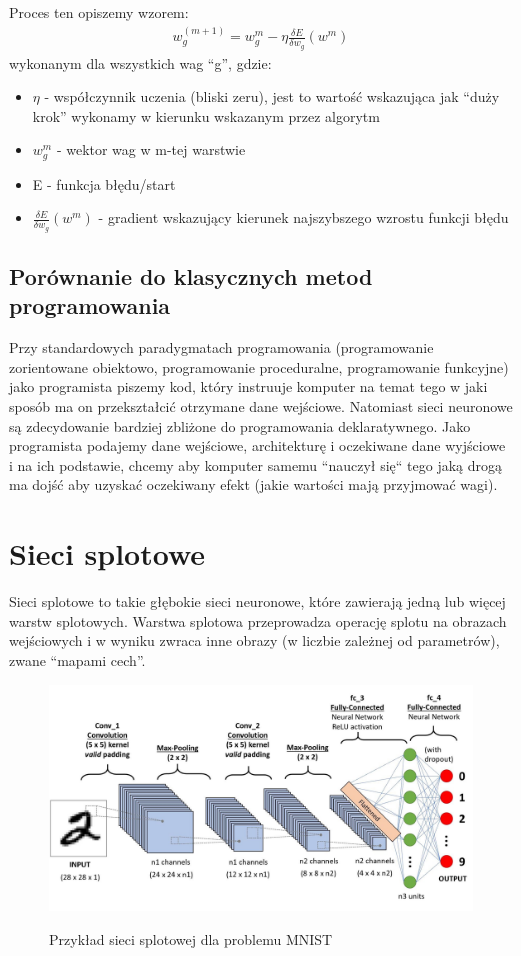 \documentclass{article}
\begin{document}
Proces ten opiszemy wzorem:
\begin{align*}
    w_g^{(m+1)}=w_g^m - \eta\frac{\delta E}{\delta w_g}(w^m)
\end{align*}
wykonanym dla wszystkich wag ``g'', gdzie:
\begin{itemize}
    \item $\eta$ - współczynnik uczenia (bliski zeru), jest to wartość wskazująca jak ``duży krok'' wykonamy w kierunku wskazanym przez algorytm
    \item $w_g^m$ - wektor wag w m-tej warstwie
    \item E - funkcja błędu/start
    \item $\frac{\delta E}{\delta w_g}(w^m)$ - gradient wskazujący kierunek najszybszego wzrostu funkcji błędu
\end{itemize}

\subsection{Porównanie do klasycznych metod programowania}
Przy standardowych paradygmatach programowania (programowanie zorientowane obiektowo, programowanie proceduralne, programowanie funkcyjne) jako programista piszemy kod, który
instruuje komputer na temat tego w jaki sposób ma on przekształcić otrzymane dane wejściowe.
Natomiast sieci neuronowe są zdecydowanie bardziej zbliżone do programowania deklaratywnego. Jako programista podajemy dane wejściowe, architekturę i oczekiwane dane wyjściowe i na ich podstawie, chcemy aby komputer samemu ``nauczył się`` tego jaką drogą ma dojść aby uzyskać oczekiwany efekt (jakie wartości mają przyjmować wagi).
\newpage
\section{Sieci splotowe}
Sieci splotowe to takie głębokie sieci neuronowe, które zawierają jedną lub więcej warstw splotowych.
Warstwa splotowa przeprowadza operację splotu na obrazach wejściowych i w wyniku zwraca inne obrazy (w liczbie zależnej od parametrów), zwane ``mapami cech''.
\begin{figure}[H]
    \centering
    \includegraphics[width=\linewidth]{images/cnn.jpeg}
    \caption{Przykład sieci splotowej dla problemu MNIST}
    \cite{cnn}
\end{figure}
\end{document}

